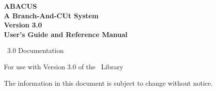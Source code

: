 
\begin{titlepage}
  \begin{center}
  \bf
  \Huge
  ABACUS\\
  \bigskip
  \bigskip
  \LARGE
  A Branch-And-CUt System\\
  \bigskip
  Version 3.0\\
  \bigskip
  User's Guide and Reference Manual\\
  \vfill
  \end{center}


\newpage
\thispagestyle{empty}
\noindent
\ABACUS\ 3.0 Documentation\\
\vspace{15mm}

\noindent
For use with Version 3.0 of the \ABACUS\ Library\\
\vspace{15mm}

\noindent
The information in this document is subject to change without notice.\\
\vspace{110mm}


\rm \normalsize

\end{titlepage}







